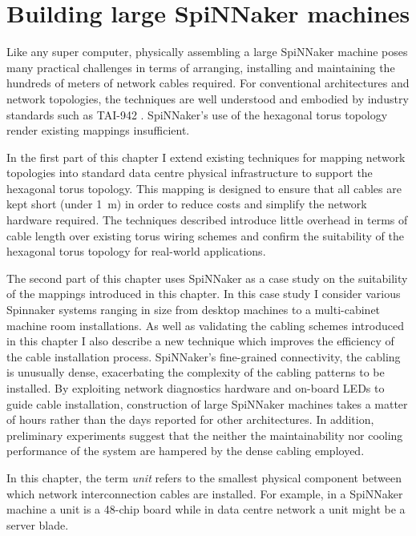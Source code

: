 \chapter{Building large SpiNNaker machines}
	
	Like any super computer, physically assembling a large SpiNNaker machine
	poses many practical challenges in terms of arranging, installing and
	maintaining the hundreds of meters of network cables required.  For
	conventional architectures and network topologies, the techniques are well
	understood and embodied by industry standards such as TAI-942 \cite{tia2006}.
	SpiNNaker's use of the hexagonal torus topology render existing mappings
	insufficient.
	
	In the first part of this chapter I extend existing techniques for mapping
	network topologies into standard data centre physical infrastructure to
	support the hexagonal torus topology. This mapping is designed to ensure that
	all cables are kept short (under \SI{1}{\meter}) in order to reduce costs and
	simplify the network hardware required. The techniques described introduce
	little overhead in terms of cable length over existing torus wiring schemes
	and confirm the suitability of the hexagonal torus topology for real-world
	applications.
	
	The second part of this chapter uses SpiNNaker as a case study on the
	suitability of the mappings introduced in this chapter.  In this case study I
	consider various Spinnaker systems ranging in size from desktop machines to a
	multi-cabinet machine room installations. As well as validating the cabling
	schemes introduced in this chapter I also describe a new technique which
	improves the efficiency of the cable installation process.  SpiNNaker's
	fine-grained connectivity, the cabling is unusually dense, exacerbating the
	complexity of the cabling patterns to be installed. By exploiting network
	diagnostics hardware and on-board LEDs to guide cable installation,
	construction of large SpiNNaker machines takes a matter of hours rather than
	the days reported for other architectures. In addition, preliminary
	experiments suggest that the neither the maintainability nor cooling
	performance of the system are hampered by the dense cabling employed.
	
	In this chapter, the term \emph{unit} refers to the smallest physical
	component between which network interconnection cables are installed. For
	example, in a SpiNNaker machine a unit is a 48-chip board while in data
	centre network a unit might be a server blade.
	
